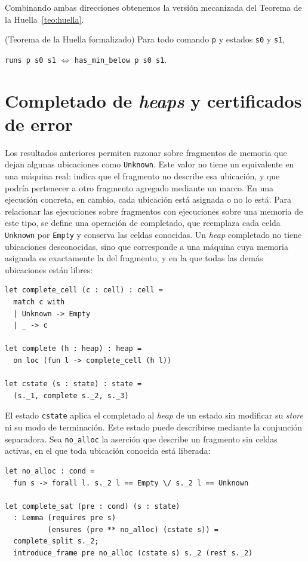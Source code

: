 \documentclass[a4paper,	11pt]{report}
\begin{document}
Combinando ambas direcciones obtenemos la versión mecanizada del Teorema de la Huella~\ref{teo:huella}.

\begin{teorema}(Teorema de la Huella formalizado)
Para todo comando \lstinline|p| y estados \lstinline|s0| y \lstinline|s1|,
\begin{center}
\lstinline|runs p s0 s1| $\iff$
\lstinline|has_min_below p s0 s1|.
\end{center}
\end{teorema}

\section{Completado de \emph{heaps} y certificados de error}
Los resultados anteriores permiten razonar sobre fragmentos de memoria que dejan algunas ubicaciones como \lstinline|Unknown|.
Este valor no tiene un equivalente en una máquina real:
indica que el fragmento no describe esa ubicación,
y que podría pertenecer a otro fragmento agregado mediante un marco.
En una ejecución concreta,
en cambio,
cada ubicación está asignada o no lo está.
Para relacionar las ejecuciones sobre fragmentos con ejecuciones sobre una memoria de este tipo,
se define una operación de completado,
que reemplaza cada celda \lstinline|Unknown| por \lstinline|Empty| y conserva las celdas conocidas.
Un \emph{heap} completado no tiene ubicaciones desconocidas,
sino que corresponde a una máquina cuya memoria asignada es exactamente la del fragmento,
y en la que todas las demás ubicaciones están libres:

\begin{lstlisting}
let complete_cell (c : cell) : cell =
  match c with
  | Unknown -> Empty
  | _ -> c

let complete (h : heap) : heap =
  on loc (fun l -> complete_cell (h l))

let cstate (s : state) : state =
  (s._1, complete s._2, s._3)
\end{lstlisting}

El estado \lstinline|cstate| aplica el completado al \emph{heap} de un estado sin modificar su \emph{store} ni su modo de terminación.
Este estado puede describirse mediante la conjunción separadora.
Sea \lstinline|no_alloc| la aserción que describe un fragmento sin celdas activas,
en el que toda ubicación conocida está liberada:

\begin{lstlisting}
let no_alloc : cond =
  fun s -> forall l. s._2 l == Empty \/ s._2 l == Unknown

let complete_sat (pre : cond) (s : state)
  : Lemma (requires pre s)
          (ensures (pre ** no_alloc) (cstate s)) =
  complete_split s._2;
  introduce_frame pre no_alloc (cstate s) s._2 (rest s._2)
\end{lstlisting}
\end{document}
